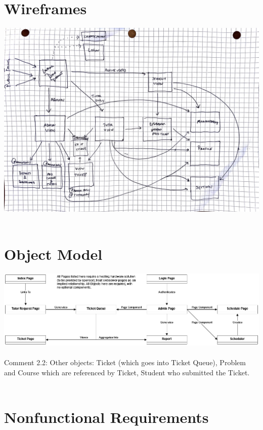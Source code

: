 \documentclass[oneside,openany,obeyspaces]{book}
\begin{document}
\begin{flushleft}
    \section{Wireframes}

    \includegraphics[width=160mm,scale=0.5]{img/wireframe.jpg}\\~\\


    \section{Object Model}

    \includegraphics[width=160mm,scale=0.5]{img/UML Object Model.png}\\~\\
    {\color{red}Comment 2.2: Other objects: Ticket (which goes into Ticket Queue), Problem and Course which are referenced by Ticket, Student who submitted the Ticket.\\~\\}

    \section{Nonfunctional Requirements}


\end{flushleft}
\end{document}
